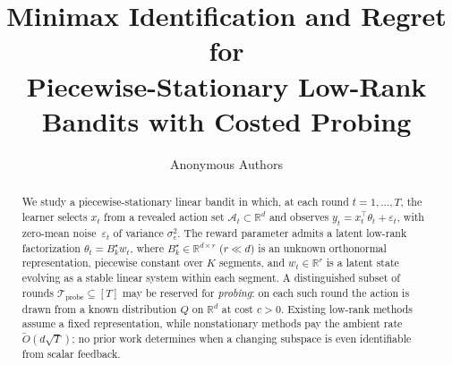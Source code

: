 \documentclass[11pt]{article}
\title{Minimax Identification and Regret for\\
Piecewise-Stationary Low-Rank Bandits with Costed Probing}
\author{
  Anonymous Authors
}
\newcommand{\R}{\mathbb{R}}
\newcommand{\cA}{\mathcal{A}}
\newcommand{\cTprobe}{\mathcal{T}_{\mathrm{probe}}}
\begin{document}
\maketitle

\begin{abstract}
We study a piecewise-stationary linear bandit in which, at each round
$t=1,\ldots,T$, the learner selects $x_t$ from a revealed action set
$\cA_t\subset\R^d$ and observes $y_t=x_t^\top\theta_t+\varepsilon_t$, with
zero-mean noise~$\varepsilon_t$ of variance $\sigma_\varepsilon^2$.
The reward parameter admits a latent low-rank factorization
$\theta_t=B_k^\star w_t$, where $B_k^\star\in\R^{d\times r}$ ($r\ll d$) is an
unknown orthonormal representation, piecewise constant over $K$ segments,
and $w_t\in\R^r$ is a latent state evolving as a stable linear system within
each segment.  A distinguished subset of rounds
$\cTprobe\subseteq[T]$ may be reserved for \emph{probing}: on each such
round the action is drawn from a known distribution $Q$ on $\R^d$ at cost
$c>0$.  Existing low-rank methods assume a fixed representation, while
nonstationary methods pay the ambient rate $\widetilde O(d\sqrt T)$; no prior
work determines when a changing subspace is even identifiable from scalar
feedback.


\end{abstract}
\end{document}
